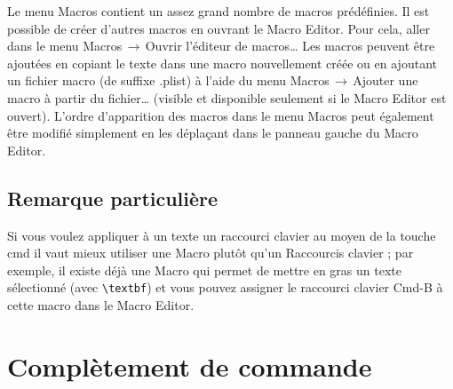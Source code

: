 \documentclass[11pt,french]{article}
\newcommand{\esckey}{\textsf{esc}}
\newcommand{\tabkey}{---\kern-5pt>|}
\newcommand{\mnu}[1]{\textsf{#1}}
\newcommand{\cmd}[1]{\textsf{#1}}
\newcommand{\To}{\,\(\to\)\,}
\begin{document}
Le menu \mnu{Macros} contient un assez grand nombre de macros prédéfinies. Il est possible de créer d'autres macros en ouvrant le \cmd{Macro Editor}. Pour cela, aller dans le menu \mnu{Macros}\To\mnu{Ouvrir l'éditeur de macros…} Les macros peuvent être ajoutées en copiant le texte dans une macro nouvellement créée ou en ajoutant un fichier macro (de suffixe \cmd{.plist}) à l'aide du menu \mnu{Macros}\To\mnu{Ajouter une macro à partir du fichier…} (visible et disponible seulement si le \cmd{Macro Editor} est ouvert). L'ordre d'apparition des macros dans le menu \mnu{Macros} peut également être modifié simplement en les déplaçant dans le panneau gauche du \cmd{Macro Editor}.

\subsection{Remarque particulière}


Si vous voulez appliquer à un texte un raccourci clavier au moyen de la touche \cmd{cmd} il vaut mieux utiliser une \cmd{Macro} plutôt qu'un \cmd{Raccourcis clavier} ; par exemple, il existe déjà une \cmd{Macro} qui permet de mettre en gras un texte sélectionné (avec \verb+\textbf+) et vous pouvez assigner le raccourci clavier \cmd{Cmd-B} à cette \cmd{macro} dans le \cmd{Macro Editor}.

\section{\cmd{Complètement de commande}}

\end{document}
